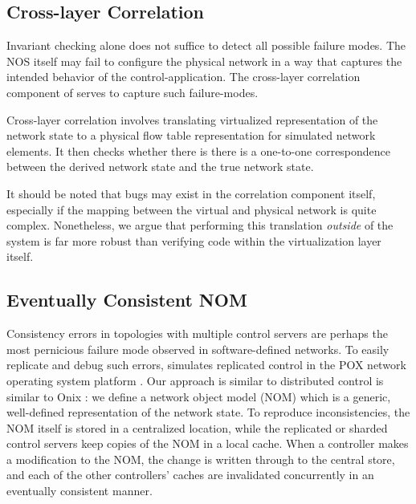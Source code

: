 \subsection{Cross-layer Correlation}
\label{sec:cross_layer_correlation}

Invariant checking alone does not suffice to detect all possible failure
modes. The NOS itself may fail to configure the physical network in a way that
captures the intended behavior of the control-application. The cross-layer correlation
component of \projectname{} serves to capture such failure-modes. 

Cross-layer correlation involves translating
virtualized representation of the network state to a physical flow table
representation for simulated network elements. It then checks whether there is
there is a one-to-one correspondence between the derived network
state and the true network state.

It should be noted that bugs may exist in the correlation component itself,
especially if the mapping between the virtual and physical network is quite
complex. Nonetheless, we argue that performing this
translation {\it outside} of the system is far more robust than verifying code within the
virtualization layer itself.


\subsection{Eventually Consistent NOM}

Consistency errors in topologies with multiple control servers are perhaps
the most pernicious failure mode observed in software-defined networks. To
easily replicate and debug such errors, \projectname{} simulates replicated
control in the POX network operating system platform \cite{pox}. Our approach
is similar to distributed control is similar to Onix \cite{onix}: we define a
network object model (NOM) which is a generic, well-defined representation of
the network state. To reproduce inconsistencies, the NOM itself is stored in a
centralized location, while the replicated or sharded control servers keep
copies of the NOM in a local cache. When a controller makes a modification to
the NOM, the change is written through to the central store, and each of the
other controllers' caches are invalidated concurrently in an eventually
consistent manner.

